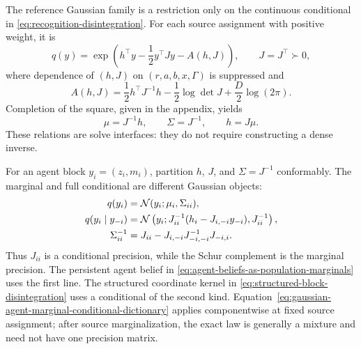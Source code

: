 The reference Gaussian family is a restriction only on the continuous conditional in \cref{eq:recognition-disintegration}.  For each source assignment with positive weight, it is
\begin{equation}
q(y)
=\exp\left(
h^\top y-\frac12y^\top Jy-A(h,J)
\right),
\qquad
J=J^\top\succ0,
\label{eq:joint-gaussian-information-form}
\end{equation}
where dependence of $(h,J)$ on $(r,a,b,x,\Gamma)$ is suppressed and
\begin{equation}
A(h,J)
=\frac12h^\top J^{-1}h
-\frac12\log\det J
+\frac D2\log(2\pi).
\label{eq:gaussian-log-normalizer}
\end{equation}
Completion of the square, given in the appendix, yields
\begin{equation}
\mu=J^{-1}h,
\qquad
\Sigma=J^{-1},
\qquad
h=J\mu.
\label{eq:information-moment-conversion}
\end{equation}
These relations are solve interfaces: they do not require constructing a dense inverse.

For an agent block $y_i=(z_i,m_i)$, partition $h$, $J$, and $\Sigma=J^{-1}$ conformably. The marginal and full conditional are different Gaussian objects:
\begin{equation}
\begin{aligned}
q(y_i)&=\mathcal N(y_i;\mu_i,\Sigma_{ii}),\\
q(y_i\mid y_{-i})
&=\mathcal N\left(
y_i;
J_{ii}^{-1}(h_i-J_{i,-i}y_{-i}),
J_{ii}^{-1}
\right),\\
\Sigma_{ii}^{-1}
&=J_{ii}-J_{i,-i}J_{-i,-i}^{-1}J_{-i,i}.
\end{aligned}
\label{eq:gaussian-agent-marginal-conditional-dictionary}
\end{equation}
Thus $J_{ii}$ is a conditional precision, while the Schur complement is the marginal precision. The persistent agent belief in \cref{eq:agent-beliefs-as-population-marginals} uses the first line. The structured coordinate kernel in \cref{eq:structured-block-disintegration} uses a conditional of the second kind. Equation~\eqref{eq:gaussian-agent-marginal-conditional-dictionary} applies componentwise at fixed source assignment; after source marginalization, the exact law is generally a mixture and need not have one precision matrix.

